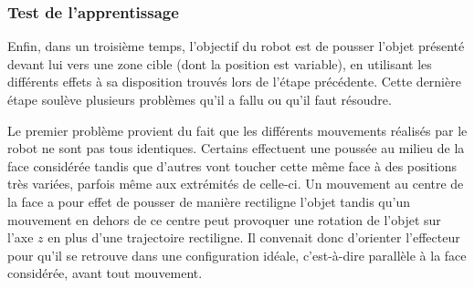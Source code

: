 \documentclass[draft]{llncs}
\begin{document}
\subsubsection{Test de l'apprentissage}

Enfin, dans un troisième temps, l'objectif du robot est de pousser l'objet présenté devant lui vers une zone cible (dont la position est variable), en utilisant les différents effets à sa disposition trouvés lors de l'étape précédente.
Cette dernière étape soulève plusieurs problèmes qu'il a fallu ou qu'il faut résoudre.



Le premier problème provient du fait que les différents mouvements réalisés par le robot ne sont pas tous identiques.
Certains effectuent une poussée au milieu de la face considérée tandis que d'autres vont toucher cette même face à des positions très variées, parfois même aux extrémités de celle-ci.
Un mouvement au centre de la face a pour effet de pousser de manière rectiligne l'objet tandis qu'un mouvement en dehors de ce centre peut provoquer une rotation de l'objet sur l'axe $z$ en plus d'une trajectoire rectiligne.
Il convenait donc d'orienter l'effecteur pour qu'il se retrouve dans une configuration idéale, c'est-à-dire parallèle à la face considérée, avant tout mouvement.
\end{document}
